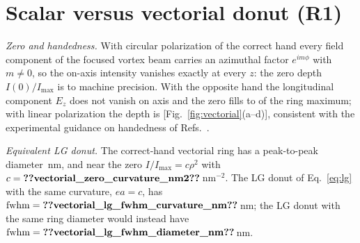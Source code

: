 \section{Scalar versus vectorial donut (R1)}\label{sec:vectorial}

\emph{Zero and handedness.} With circular polarization of the correct hand every field component
of the focused vortex beam carries an azimuthal factor $e^{im\phi}$ with $m\neq0$, so the
on-axis intensity vanishes exactly at every $z$: the zero depth $I(0)/I_{\max}$ is
 to machine precision. With
the opposite hand the longitudinal component $E_z$ does not vanish on axis and the zero fills to
 of the
ring maximum; with linear polarization the depth is
[Fig.~\ref{fig:vectorial}(a--d)], consistent with the experimental guidance on handedness of
Refs.~\cite{Lopez2023,Caprile2022}.

\emph{Equivalent LG donut.} The correct-hand vectorial ring has a peak-to-peak diameter
\,nm, and
near the zero $I/I_{\max}=c\rho^2$ with
$c=\pnum{vectorial_zero_curvature_nm2}\src{vectorial_zero_curvature_nm2}$\,nm$^{-2}$. The LG
donut of Eq.~\eqref{eq:lg} with the same curvature, $ea=c$, has
$\fwhm=\pnum{vectorial_lg_fwhm_curvature_nm}\src{vectorial_lg_fwhm_curvature_nm}$\,nm; the LG
donut with the same ring diameter would instead have
$\fwhm=\pnum{vectorial_lg_fwhm_diameter_nm}\src{vectorial_lg_fwhm_diameter_nm}$\,nm.

